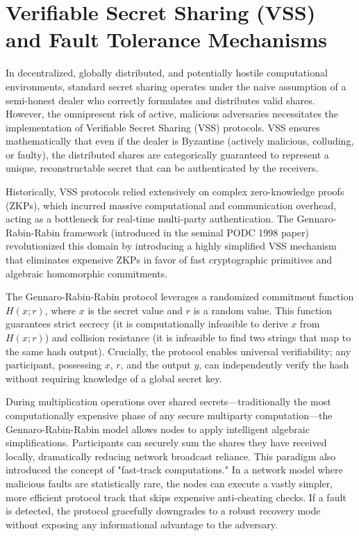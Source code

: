 \documentclass[11pt, a4paper]{article}
\begin{document}
\section*{Verifiable Secret Sharing (VSS) and Fault Tolerance Mechanisms}
In decentralized, globally distributed, and potentially hostile computational environments, standard secret sharing operates under the naive assumption of a semi-honest dealer who correctly formulates and distributes valid shares. However, the omnipresent risk of active, malicious adversaries necessitates the implementation of Verifiable Secret Sharing (VSS) protocols. VSS ensures mathematically that even if the dealer is Byzantine (actively malicious, colluding, or faulty), the distributed shares are categorically guaranteed to represent a unique, reconstructable secret that can be authenticated by the receivers.

Historically, VSS protocols relied extensively on complex zero-knowledge proofs (ZKPs), which incurred massive computational and communication overhead, acting as a bottleneck for real-time multi-party authentication. The Gennaro-Rabin-Rabin framework (introduced in the seminal PODC 1998 paper) revolutionized this domain by introducing a highly simplified VSS mechanism that eliminates expensive ZKPs in favor of fast cryptographic primitives and algebraic homomorphic commitments.

The Gennaro-Rabin-Rabin protocol leverages a randomized commitment function $H(x; r)$, where $x$ is the secret value and $r$ is a random value. This function guarantees strict secrecy (it is computationally infeasible to derive $x$ from $H(x; r)$) and collision resistance (it is infeasible to find two strings that map to the same hash output). Crucially, the protocol enables universal verifiability; any participant, possessing $x$, $r$, and the output $y$, can independently verify the hash without requiring knowledge of a global secret key.

During multiplication operations over shared secrets—traditionally the most computationally expensive phase of any secure multiparty computation—the Gennaro-Rabin-Rabin model allows nodes to apply intelligent algebraic simplifications. Participants can securely sum the shares they have received locally, dramatically reducing network broadcast reliance. This paradigm also introduced the concept of "fast-track computations." In a network model where malicious faults are statistically rare, the nodes can execute a vastly simpler, more efficient protocol track that skips expensive anti-cheating checks. If a fault is detected, the protocol gracefully downgrades to a robust recovery mode without exposing any informational advantage to the adversary.
\end{document}
